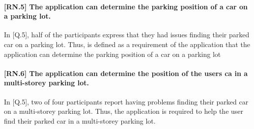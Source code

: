 \paragraph{[RN.5] The application can determine the parking position of a car on a parking lot.}
In [Q.5], half of the participants express that they had issues finding their parked car on a parking lot. Thus, is defined as a requirement of the application that the application can determine the parking position of a car on a parking lot


\paragraph{[RN.6] The application can determine the position of the users ca in a multi-storey parking lot.}
In [Q.5], two of four participants report having problems finding their parked car on a multi-storey parking lot. Thus, the application is required to help the user find their parked car in a multi-storey parking lot. 



